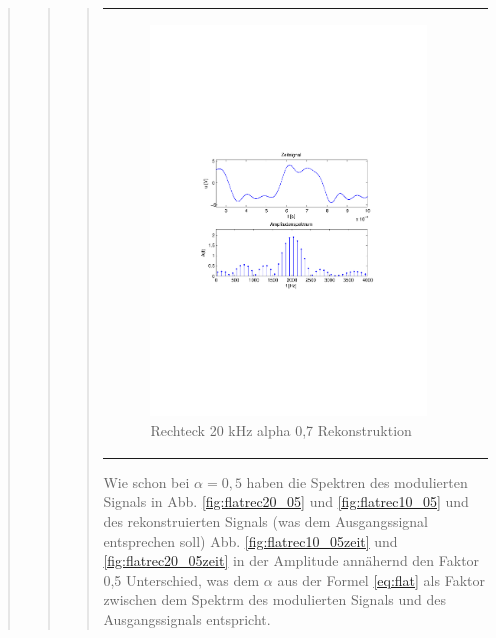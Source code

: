 \begin{quote}
\begin{quote}
\begin{quote}
\begin{center}
\begin{tabular}{ll}
                \begin{minipage}{0.6\textwidth}
                    \begin{figure}[H]
                        \includegraphics[scale=0.7, trim = 35mm 100mm 35mm 95mm, clip]{Bilder/flatrec20_07}
                       \caption{Rechteck 20 kHz alpha 0,7 Rekonstruktion}
		              \label{fig:flatrec20_07}
                    \end{figure}
                \end{minipage}
            
            \end{tabular}
            \end{center}
             
            Wie schon bei $\alpha=0,5$ haben die Spektren des modulierten Signals in Abb. \ref{fig:flatrec20_05} und
            \ref{fig:flatrec10_05} und des rekonstruierten Signals (was dem Ausgangssignal entsprechen soll) Abb. \ref{fig:flatrec10_05zeit} und
            \ref{fig:flatrec20_05zeit} in der Amplitude annähernd den Faktor 0,5 Unterschied, was dem $\alpha$
            aus der Formel \ref{eq:flat} als Faktor zwischen dem Spektrm des modulierten Signals und des
            Ausgangssignals entspricht.
                        

\end{quote}
\end{quote}
\end{quote}
